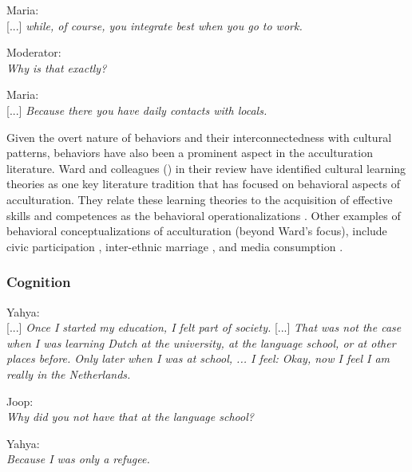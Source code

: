 \documentclass[man, 12pt, a4paper, mask]{apa7}
\begin{document}
\begin{displayquote}
    Maria:\\
    {[...]} \textit{while, of course, you integrate best when you go to work.}
    
    Moderator:\\
    \textit{Why is that exactly?}
    
    Maria:\\
    {[...]} \textit{Because there you have daily contacts with locals.}
\end{displayquote}

Given the overt nature of behaviors and their interconnectedness with cultural patterns, behaviors have also been a prominent aspect in the acculturation literature. Ward and colleagues (\citeyear{Ward2019}) in their review have identified cultural learning theories as one key literature tradition that has focused on behavioral aspects of acculturation. They relate these learning theories to the acquisition of effective skills and competences as the behavioral operationalizations \citep[including, verbal and non-verbal communication skills][]{Ward2001}. Other examples of behavioral conceptualizations of acculturation (beyond Ward's focus), include civic participation \citep[e.g., voting;][]{Lessard-Phillips2020}, inter-ethnic marriage \citep[e.g.,][]{Song2009}, and media consumption \citep[e.g.,][]{Shoemaker1985}. 

\subsubsection{Cognition}
\begin{displayquote}
    Yahya:\\
    {[...]} \textit{Once I started my education, I felt part of society.} {[...]} \textit{That was not the case when I was learning Dutch at the university, at the language school, or at other places before. Only later when I was at school, ... I feel: Okay, now I feel I am really in the Netherlands.}
    
    Joop:\\
    \textit{Why did you not have that at the language school?}
    
    Yahya:\\
    \textit{Because I was only a refugee.}
\end{displayquote}
\end{document}
